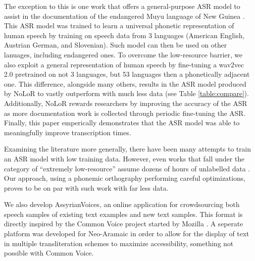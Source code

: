 \documentclass[letterpaper]{article} %
\begin{document}
The exception to this is one work that offers a general-purpose ASR model to assist in the documentation of the endangered Muyu language of New Guinea \cite{zahrer-etal-2020-towards}. This ASR model was trained to learn a universal phonetic representation of human speech by training on speech data from 3 languages (American English, Austrian German, and Slovenian). Such model can then be used on other lanuages, including endangered ones. To overcome the low-resource barrier, we also exploit a general representation of human speech by fine-tuning a wav2vec 2.0 pretrained on not 3 languages, but 53 languages then a phonetically adjacent one. This difference, alongside many others, results in the ASR model produced by NoLoR to vastly outperform with much less data (see Table \ref{table:compare}). Additionally, NoLoR rewards researchers by improving the accuracy of the ASR as more documentation work is collected through periodic fine-tuning the ASR. Finally, this paper emperically demonstrates that the ASR model was able to meaningfully improve transcription times.

\begin{table}[t]
    \centering
    \caption{Comparison of previous examples of low-resource ASR and ours}
    \label{table:compare}
\end{table}

Examining the literature more generally, there have been many attempts to train an ASR model with low training data. However, even works that fall under the category of ``extremely low-resource'' assume dozens of hours of unlabelled data \cite{lrspeech}. Our approach, using a phonemic orthography performing careful optimizations, proves to be on par with such work with far less data.

We also develop AssyrianVoices, an online application for crowdsourcing both speech samples of existing text examples and new text samples. This format is directly inspired by the Common Voice project started by Mozilla \cite{commonvoice}. A seperate platform was developed for Neo-Aramaic in order to allow for the display of text in multiple transliteration schemes to maximize accessibility, something not possible with Common Voice.
\end{document}
